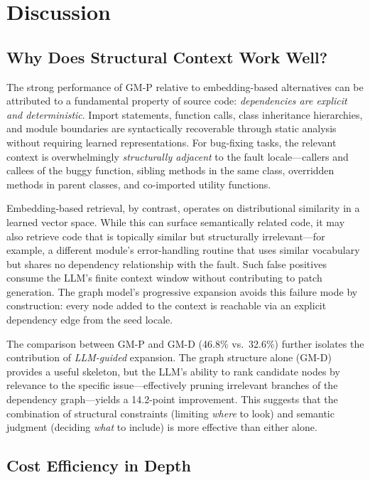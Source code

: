 \section{Discussion}
\label{sec:discussion}

\subsection{Why Does Structural Context Work Well?}

The strong performance of GM-P relative to embedding-based alternatives can be attributed to a fundamental property of source code: \emph{dependencies are explicit and deterministic}. Import statements, function calls, class inheritance hierarchies, and module boundaries are syntactically recoverable through static analysis without requiring learned representations. For bug-fixing tasks, the relevant context is overwhelmingly \emph{structurally adjacent} to the fault locale---callers and callees of the buggy function, sibling methods in the same class, overridden methods in parent classes, and co-imported utility functions.

Embedding-based retrieval, by contrast, operates on distributional similarity in a learned vector space. While this can surface semantically related code, it may also retrieve code that is topically similar but structurally irrelevant---for example, a different module's error-handling routine that uses similar vocabulary but shares no dependency relationship with the fault. Such false positives consume the LLM's finite context window without contributing to patch generation. The graph model's progressive expansion avoids this failure mode by construction: every node added to the context is reachable via an explicit dependency edge from the seed locale.

The comparison between GM-P and GM-D (46.8\% vs.\ 32.6\%) further isolates the contribution of \emph{LLM-guided} expansion. The graph structure alone (GM-D) provides a useful skeleton, but the LLM's ability to rank candidate nodes by relevance to the specific issue---effectively pruning irrelevant branches of the dependency graph---yields a 14.2-point improvement. This suggests that the combination of structural constraints (limiting \emph{where} to look) and semantic judgment (deciding \emph{what} to include) is more effective than either alone.

\subsection{Cost Efficiency in Depth}

